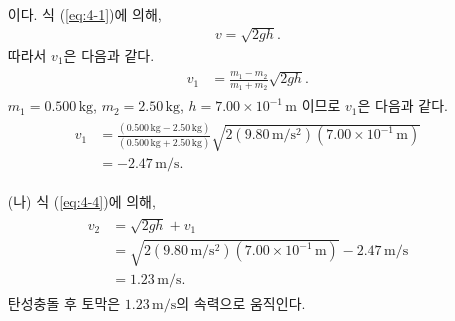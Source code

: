 \documentclass[floatfix,nofootinbib,superscriptaddress,fleqn]{revtex4-2}
\begin{document}
\begin{itemize}
\begin{align}
\end{align}
이다. 식 (\ref{eq:4-1})에 의해,
\begin{align}
  v = \sqrt{2gh}.
\end{align}
따라서 $v_1$은 다음과 같다.
\begin{align}
  \begin{split}
    v_1 &= \frac{m_1-m_2}{m_1+m_2}\sqrt{2gh}.
  \end{split}
\end{align}
$m_1= 0.500\,\mathrm{kg}$, $m_2 = 2.50\,\mathrm{kg}$, 
$h=7.00\times 10^{-1}\,\mathrm{m}$ 이므로 $v_1$은 다음과 같다.
\begin{align}
  \begin{split}
    v_1 &= \frac{(0.500\,\mathrm{kg}-2.50\,\mathrm{kg})}
    {(0.500\,\mathrm{kg}+2.50\,\mathrm{kg})}
    \sqrt{2(9.80\,\mathrm{m/s^2})(7.00\times 10^{-1}\,\mathrm{m})}  \\
    &= -2.47\,\mathrm{m/s}.
  \end{split}
\end{align}
\item[(나)] 식 (\ref{eq:4-4})에 의해,
\begin{align}
  \begin{split}
    v_2 &= \sqrt{2gh}+v_1  \\
    &=\sqrt{2(9.80\,\mathrm{m/s^2})(7.00\times 10^{-1}\,\mathrm{m})}
    -2.47\,\mathrm{m/s} \\
    &=1.23\,\mathrm{m/s}.
  \end{split}
\end{align}
탄성충돌 후 토막은 $1.23\,\mathrm{m/s}$의 속력으로 움직인다.
\end{itemize}
\end{document}
